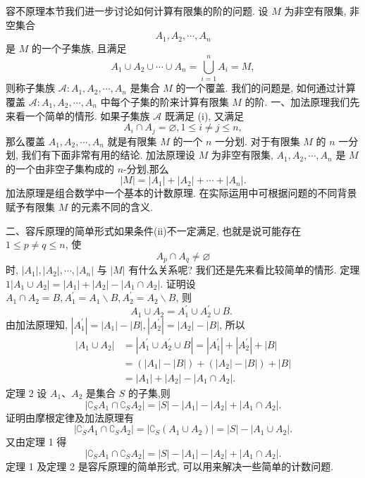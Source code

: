 
容不原理本节我们进一步讨论如何计算有限集的阶的问题.
设 $M$ 为非空有限集, 非空集合
$$
A_1, A_2, \cdots, A_n
$$
是 $M$ 的一个子集族, 且满足
$$
A_1 \cup A_2 \cup \cdots \cup A_n=\bigcup_{i=1}^n A_i=M,
$$
则称子集族 $\mathscr{A}: A_1, A_2, \cdots, A_n$ 是集合 $M$ 的一个覆盖.
我们的问题是, 如何通过计算覆盖 $\mathscr{A}: A_1, A_2, \cdots, A_n$ 中每个子集的阶来计算有限集 $M$ 的阶.
一、加法原理我们先来看一个简单的情形.
如果子集族 $\mathscr{A}$ 既满足 (i), 又满足
$$
A_i \cap A_j=\varnothing, 1 \leqslant i \neq j \leqslant n,
$$
那么覆盖 $A_1, A_2, \cdots, A_n$ 就是有限集 $M$ 的一个 $n$ 一分划.
对于有限集 $M$ 的 $n$ 一分划, 我们有下面非常有用的结论.
加法原理设 $M$ 为非空有限集, $A_1, A_2, \cdots, A_n$ 是 $M$ 的一个由非空子集构成的 $n$-分划,那么
$$
|M|=\left|A_1\right|+\left|A_2\right|+\cdots+\left|A_n\right| .
$$
加法原理是组合数学中一个基本的计数原理.
在实际运用中可根据问题的不同背景赋予有限集 $M$ 的元素不同的含义.



二、容斥原理的简单形式如果条件(ii)不一定满足, 也就是说可能存在 $1 \leqslant p \neq q \leqslant n$, 使
$$
A_p \cap A_q \neq \varnothing
$$
时, $\left|A_1\right|,\left|A_2\right|, \cdots,\left|A_n\right|$ 与 $|M|$ 有什么关系呢? 我们还是先来看比较简单的情形.
定理 $1\left|A_1 \cup A_2\right|=\left|A_1\right|+\left|A_2\right|-\left|A_1 \cap A_2\right|$.
证明设 $A_1 \cap A_2=B, A_1^{\prime}=A_1 \backslash B, A_2^{\prime}=A_2 \backslash B$, 则
$$
A_1 \cup A_2=A_1^{\prime} \cup A_2^{\prime} \cup B \text {. }
$$
由加法原理知, $\left|A_1^{\prime}\right|=\left|A_1\right|-|B|,\left|A_2^{\prime}\right|=\left|A_2\right|-|B|$, 所以
$$
\begin{aligned}
\left|A_1 \cup A_2\right| & =\left|A_1^{\prime} \cup A_2^{\prime} \cup B\right|=\left|A_1^{\prime}\right|+\left|A_2^{\prime}\right|+|B| \\
& =\left(\left|A_1\right|-|B|\right)+\left(\left|A_2\right|-|B|\right)+|B| \\
& =\left|A_1\right|+\left|A_2\right|-\left|A_1 \cap A_2\right| .
\end{aligned}
$$
定理 2 设 $A_1 、 A_2$ 是集合 $S$ 的子集,则
$$
\left|\complement_S A_1 \cap \complement_S A_2\right|=|S|-\left|A_1\right|-\left|A_2\right|+\left|A_1 \cap A_2\right| .
$$
证明由摩根定律及加法原理有
$$
\left|\complement_S A_1 \cap \complement_S A_2\right|=\left|\complement_S\left(A_1 \cup A_2\right)\right|=|S|-\left|A_1 \cup A_2\right| .
$$
又由定理 1 得
$$
\left|\complement_S A_1 \cap \complement_S A_2\right|=|S|-\left|A_1\right|-\left|A_2\right|+\left|A_1 \cap A_2\right| .
$$
定理 1 及定理 2 是容斥原理的简单形式, 可以用来解决一些简单的计数问题.



